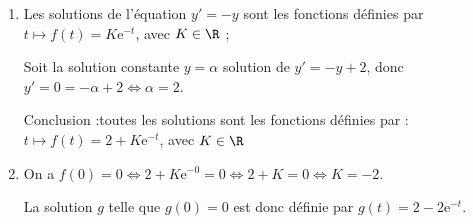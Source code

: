 \medskip

\begin{enumerate}
\item Les solutions de l'équation $y' = - y$ sont les fonctions définies par $t \longmapsto f(t) = K\text{e}^{- t}$, avec $K \in \R$ ;

Soit la solution constante $y = \alpha$ solution de $y'=-y+2$, donc $y' = 0 = - \alpha + 2 \iff \alpha = 2$.

Conclusion :toutes les solutions sont les fonctions définies par : $ t \longmapsto f(t ) =2 + K\text{e}^{- t}$, avec $K \in \R$

\item On a $f(0) = 0 \iff 2 + K\text{e}^{- 0} = 0 \iff 2 + K = 0 \iff K = - 2$.

La solution $g$ telle que $g(0) = 0$ est donc définie par $g(t) = 2 - 2\text{e}^{-t}$. 
\end{enumerate}

\bigskip
